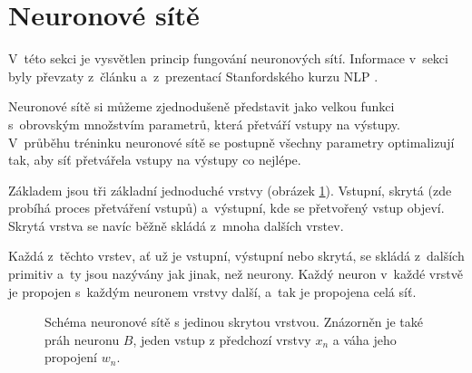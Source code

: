 \section{Neuronové sítě}
\label{neuronove_site}
V~této sekci je vysvětlen princip fungování neuronových sítí. Informace v~sekci byly převzaty z~článku \cite{neural_nets} a~z~prezentací Stanfordského kurzu NLP \cite{stanford:nlp}.\par
Neuronové sítě si můžeme zjednodušeně představit jako velkou funkci s~obrovským množstvím parametrů, která přetváří vstupy na výstupy. V~průběhu tréninku neuronové sítě se postupně všechny parametry optimalizují tak, aby síť přetvářela vstupy na výstupy co nejlépe.\par
Základem jsou tři základní jednoduché vrstvy (obrázek \ref{three_layers}). Vstupní, skrytá (zde probíhá proces přetváření vstupů) a~výstupní, kde se přetvořený vstup objeví. Skrytá vrstva se navíc běžně skládá z~mnoha dalších vrstev.\par
Každá z~těchto vrstev, ať už je vstupní, výstupní nebo skrytá, se skládá z~dalších primitiv a~ty jsou nazývány jak jinak, než neurony. Každý neuron v~každé vrstvě je propojen s~každým neuronem vrstvy další, a~tak je propojena celá síť.

\begin{figure}[hbt]
	\centering
	\caption{Schéma neuronové sítě s jedinou skrytou vrstvou. Znázorněn je také práh neuronu $B$, jeden vstup z předchozí vrstvy $x_n$ a váha jeho propojení $w_n$.}
	\label{three_layers}
\end{figure}

